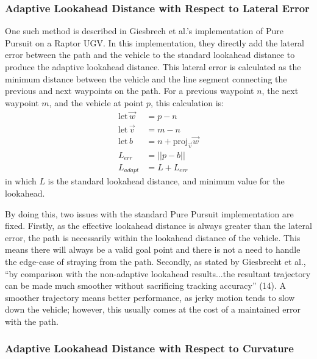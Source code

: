 \documentclass[12pt]{article}
\begin{document}
\begin{flushleft}
\subsubsection{Adaptive Lookahead Distance with Respect to Lateral Error}

One such method is described in Giesbrech et al.'s implementation of Pure Pursuit on a Raptor UGV. In this implementation, they directly add the lateral error between the path and the vehicle to the standard lookahead distance to produce the adaptive lookahead distance. This lateral error is calculated as the minimum distance between the vehicle and the line segment connecting the previous and next waypoints on the path. For a previous waypoint $n$, the next waypoint $m$, and the vehicle at point $p$, this calculation is:
\begin{subequations}
\begin{align}
\text{let}\,\vec{w} &= p - n \\
\text{let}\,\vec{v} &= m - n \\
\text{let}\, b &= n + \text{proj}_{\vec{v}}\vec{w} \label{eqn:nearestPoint}\\
L_{err} &= ||p-b|| \\
L_{adapt} &= L + L_{err}
\end{align}
\end{subequations}
in which $L$ is the standard lookahead distance, and minimum value for the lookahead.

By doing this, two issues with the standard Pure Pursuit implementation are fixed. Firstly, as the effective lookahead distance is always greater than the lateral error, the path is necessarily within the lookahead distance of the vehicle. This means there will always be a valid goal point and there is not a need to handle the edge-case of straying from the path. Secondly, as stated by Giesbrecht et al., ``by comparison with the non-adaptive lookahead results...the resultant trajectory can be made much smoother without sacrificing tracking accuracy'' (14). A smoother trajectory means better performance, as jerky motion tends to slow down the vehicle; however, this usually comes at the cost of a maintained error with the path.

\subsubsection{Adaptive Lookahead Distance with Respect to Curvature}


\end{flushleft}
\end{document}
